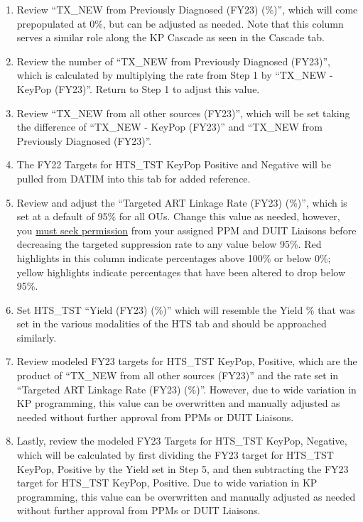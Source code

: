 \documentclass[
  openany]{book}
\begin{document}
\begin{enumerate}
\def\labelenumi{\arabic{enumi}.}
\item
  Review ``TX\_NEW from Previously Diagnosed (FY23) (\%)'', which will
  come prepopulated at 0\%, but can be adjusted as needed. Note that
  this column serves a similar role along the KP Cascade as seen in
  the Cascade tab.
\item
  Review the number of ``TX\_NEW from Previously Diagnosed (FY23)'',
  which is calculated by multiplying the rate from Step 1 by ``TX\_NEW -
  KeyPop (FY23)''. Return to Step 1 to adjust this value.
\item
  Review ``TX\_NEW from all other sources (FY23)'', which will be set
  taking the difference of ``TX\_NEW - KeyPop (FY23)'' and ``TX\_NEW from
  Previously Diagnosed (FY23)''.
\item
  The FY22 Targets for HTS\_TST KeyPop Positive and Negative will be
  pulled from DATIM into this tab for added reference.
\item
  Review and adjust the ``Targeted ART Linkage Rate (FY23) (\%)'', which
  is set at a default of 95\% for all OUs. Change this value as needed,
  however, you \underline{must seek permission} from your assigned PPM and
  DUIT Liaisons before decreasing the targeted suppression rate to any
  value below 95\%. Red highlights in this column indicate percentages
  above 100\% or below 0\%; yellow highlights indicate percentages that
  have been altered to drop below 95\%.
\item
  Set HTS\_TST ``Yield (FY23) (\%)'' which will resemble the Yield \% that
  was set in the various modalities of the HTS tab and should be
  approached similarly.
\item
  Review modeled FY23 targets for HTS\_TST KeyPop, Positive, which are
  the product of ``TX\_NEW from all other sources (FY23)'' and the rate
  set in ``Targeted ART Linkage Rate (FY23) (\%)''. However, due to wide
  variation in KP programming, this value can be overwritten and
  manually adjusted as needed without further approval from PPMs or
  DUIT Liaisons.
\item
  Lastly, review the modeled FY23 Targets for HTS\_TST KeyPop,
  Negative, which will be calculated by first dividing the FY23 target
  for HTS\_TST KeyPop, Positive by the Yield set in Step 5, and then
  subtracting the FY23 target for HTS\_TST KeyPop, Positive. Due to
  wide variation in KP programming, this value can be overwritten and
  manually adjusted as needed without further approval from PPMs or
  DUIT Liaisons.
\end{enumerate}
\end{document}
